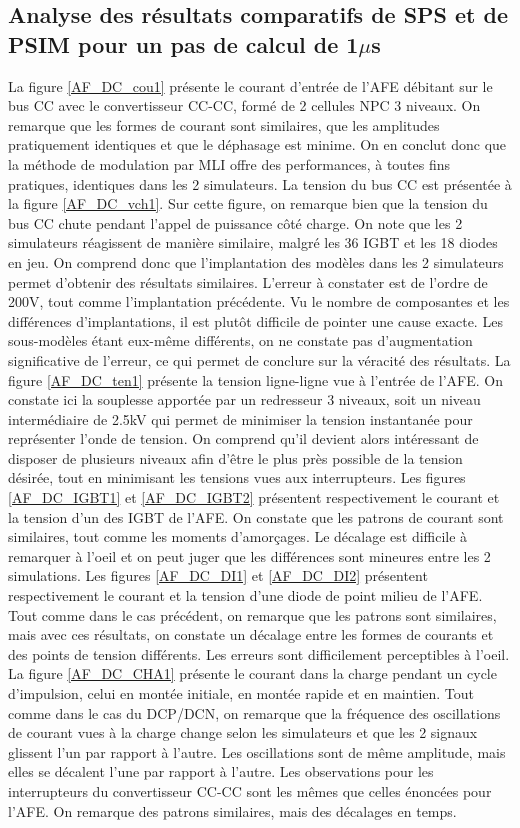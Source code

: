 \subsection{Analyse des résultats comparatifs de SPS et de PSIM pour un pas de calcul de 1$\mu$s}
La figure \ref{AF_DC_cou1} présente le courant d'entrée de l'AFE débitant sur le bus CC avec le convertisseur CC-CC, formé de 2 cellules NPC 3 niveaux. On remarque que les formes de courant sont similaires, 	que les amplitudes pratiquement identiques et que le déphasage est minime. On en conclut donc que la méthode de modulation par MLI offre des performances, à toutes fins pratiques, identiques dans les 2 simulateurs.
La tension du bus CC est présentée à la figure \ref{AF_DC_vch1}. Sur cette figure, on remarque bien que la tension du bus CC chute pendant l'appel de puissance côté charge. On note que les 2 simulateurs réagissent de manière similaire, malgré les 36 IGBT et les 18 diodes en jeu. On comprend donc que l'implantation des modèles dans les 2 simulateurs permet d'obtenir des résultats similaires. L'erreur à constater est de l'ordre de 200V, tout comme l'implantation précédente. Vu le nombre de composantes et les différences d'implantations, il est plutôt difficile de pointer une cause exacte. Les sous-modèles étant eux-même différents, on ne constate pas d'augmentation significative de l'erreur, ce qui permet de conclure sur la véracité des résultats. 
La figure \ref{AF_DC_ten1} présente la tension ligne-ligne vue à l'entrée de l'AFE. On constate ici la souplesse apportée par un redresseur 3 niveaux, soit un niveau intermédiaire de 2.5kV qui permet de minimiser la tension instantanée pour représenter l'onde de tension. On comprend qu'il devient alors intéressant de disposer de plusieurs niveaux afin d'être le plus près possible de la tension désirée, tout en minimisant les tensions vues aux interrupteurs.
Les figures \ref{AF_DC_IGBT1} et \ref{AF_DC_IGBT2} présentent respectivement le courant et la tension d'un des IGBT de l'AFE. On constate que les patrons de courant sont similaires, tout comme les moments d'amorçages. Le décalage est difficile à remarquer à l'oeil et on peut juger que les différences sont mineures entre les 2 simulations. 
Les figures \ref{AF_DC_DI1} et \ref{AF_DC_DI2} présentent respectivement le courant et la tension d'une diode de point milieu de l'AFE. Tout comme dans le cas précédent, on remarque que les patrons sont similaires, mais avec ces résultats, on constate un décalage entre les formes de courants et des points de tension différents. Les erreurs sont difficilement perceptibles à l'oeil. 
La figure \ref{AF_DC_CHA1} présente le courant dans la charge pendant un cycle d'impulsion, celui en montée initiale, en montée rapide et en maintien. Tout comme dans le cas du DCP/DCN, on remarque que la fréquence des oscillations de courant vues à la charge change selon les simulateurs et que les 2 signaux glissent l'un par rapport à l'autre. Les oscillations sont de même amplitude, mais elles se décalent l'une par rapport à l'autre.
Les observations pour les interrupteurs du convertisseur CC-CC sont les mêmes que celles énoncées pour l'AFE. On remarque des patrons similaires, mais des décalages en temps.
\clearpage

